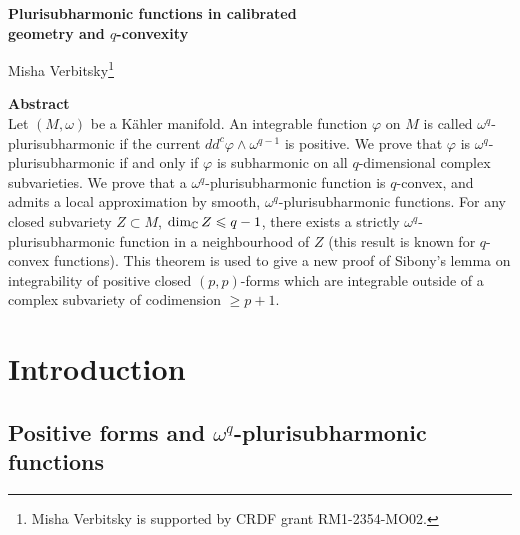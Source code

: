 \documentclass[11pt]{article}
\numberwithin{equation}{section}
\newcommand{\C}{{\Bbb C}}
\newcommand{\6}{\partial}
\renewcommand{\phi}{\varphi}
\renewcommand{\geq}{\geqslant}
\renewcommand{\leq}{\leqslant}
\newcounter{lemma}[section]
\newcounter{theorem}[section]
\begin{document}
\begin{center}
{\LARGE\bf
Plurisubharmonic functions in calibrated\\[1mm] geometry and $q$-convexity\\[4mm]
}

 Misha
Verbitsky\footnote{Misha Verbitsky is 
supported by CRDF grant RM1-2354-MO02.}

\end{center}

{\small \hspace{0.15\linewidth}
\begin{minipage}[t]{0.7\linewidth}
{\bf Abstract} \\ 
Let $(M, \omega)$ be a K\"ahler manifold. 
An integrable function $\phi$ on $M$ is called
$\omega^q$-plurisubharmonic if the current
$dd^c\phi\wedge \omega^{q-1}$ is positive.
We prove that $\phi$ is $\omega^q$-plurisubharmonic
if and only if $\phi$ is subharmonic on all
$q$-dimensional complex subvarieties. We prove
that a $\omega^q$-plurisubharmonic function
is $q$-convex, and admits a local approximation
by smooth, $\omega^q$-plurisubharmonic functions.
For any closed subvariety $Z\subset M$, 
$\dim_\C Z\leq q-1$, there exists a strictly
$\omega^q$-plurisubharmonic function in a neighbourhood
of $Z$ (this result is known for $q$-convex
functions). This theorem is used to give a new
proof of Sibony's lemma on integrability of
positive closed $(p,p)$-forms which are integrable
outside of a complex subvariety of codimension  
$\geq p+1$.
\end{minipage}
}


\tableofcontents



\section{Introduction}


\subsection{Positive forms and $\omega^q$-plurisubharmonic functions}
\end{document}
